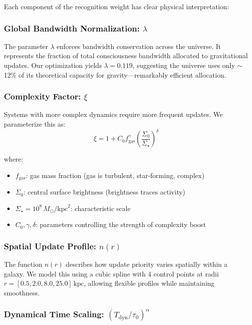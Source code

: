 \documentclass[10pt,a4paper]{article}
\newcommand{\Msun}{M_{\odot}}
\newcommand{\kpc}{\text{kpc}}
\begin{document}
Each component of the recognition weight has clear physical interpretation:

\subsubsection{Global Bandwidth Normalization: $\lambda$}

The parameter $\lambda$ enforces bandwidth conservation across the universe. It represents the fraction of total consciousness bandwidth allocated to gravitational updates. Our optimization yields $\lambda = 0.119$, suggesting the universe uses only $\sim$12\% of its theoretical capacity for gravity---remarkably efficient allocation.

\subsubsection{Complexity Factor: $\xi$}

Systems with more complex dynamics require more frequent updates. We parameterize this as:
\begin{equation}
\xi = 1 + C_0 f_{\text{gas}}^\gamma \left(\frac{\Sigma_0}{\Sigma_\star}\right)^\delta
\end{equation}

where:
\begin{itemize}
\item $f_{\text{gas}}$: gas mass fraction (gas is turbulent, star-forming, complex)
\item $\Sigma_0$: central surface brightness (brightness traces activity)
\item $\Sigma_\star = 10^8\,\Msun/\kpc^2$: characteristic scale
\item $C_0, \gamma, \delta$: parameters controlling the strength of complexity boost
\end{itemize}

\subsubsection{Spatial Update Profile: $n(r)$}

The function $n(r)$ describes how update priority varies spatially within a galaxy. We model this using a cubic spline with 4 control points at radii $r = [0.5, 2.0, 8.0, 25.0]\,\kpc$, allowing flexible profiles while maintaining smoothness.

\subsubsection{Dynamical Time Scaling: $(T_{\text{dyn}}/\tau_0)^\alpha$}
\end{document}
